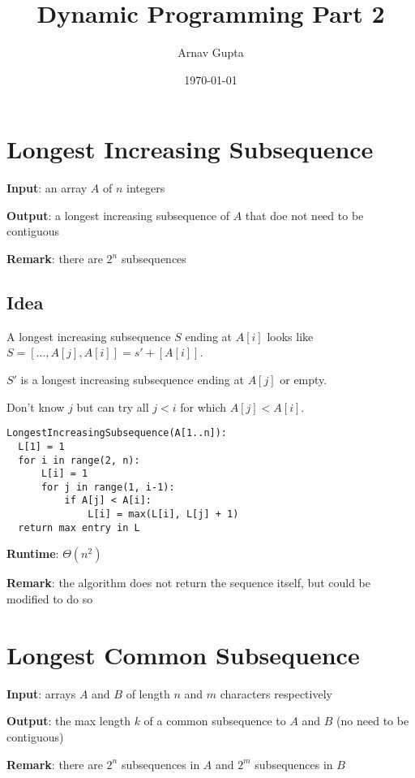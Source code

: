 \documentclass[11pt]{article}
\author{Arnav Gupta}
\date{\today}
\title{Dynamic Programming Part 2}
\begin{document}
\maketitle
\tableofcontents

\section{Longest Increasing Subsequence}
\label{sec:orgc9e0fca}
\textbf{Input}: an array \(A\) of \(n\) integers

\textbf{Output}: a longest increasing subsequence of \(A\) that doe not need to be contiguous

\textbf{Remark}: there are \(2^{n}\) subsequences
\subsection{Idea}
\label{sec:org467c0ff}
A longest increasing subsequence \(S\) ending at \(A[i]\) looks like
\(S = [..., A[j], A[i]] = s' + [A[i]]\).

\(S'\) is a longest increasing subsequence ending at \(A[j]\) or empty.

Don't know \(j\) but can try all \(j < i\) for which \(A[j] < A[i]\).

\begin{verbatim}
LongestIncreasingSubsequence(A[1..n]):
  L[1] = 1
  for i in range(2, n):
      L[i] = 1
      for j in range(1, i-1):
          if A[j] < A[i]:
              L[i] = max(L[i], L[j] + 1)
  return max entry in L
\end{verbatim}

\textbf{Runtime}: \(\Theta(n^{2})\)

\textbf{Remark}: the algorithm does not return the sequence itself, but could be modified
to do so
\section{Longest Common Subsequence}
\label{sec:org4848e07}
\textbf{Input}: arrays \(A\) and \(B\) of length \(n\) and \(m\) characters respectively

\textbf{Output}: the max length \(k\) of a common subsequence to \(A\) and \(B\) (no need to be contiguous)

\textbf{Remark}: there are \(2^{n}\) subsequences in \(A\) and \(2^{m}\) subsequences in \(B\)
\end{document}
